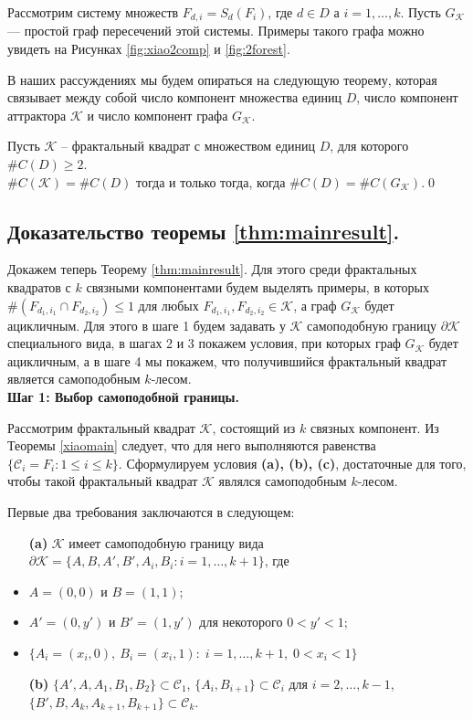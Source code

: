 Рассмотрим систему множеств $F_{d,i}= S_d(F_i)$, где $d\in D$ а $i=1,...,k$.
Пусть $G_{\mathcal{K}}$ --- простой  граф пересечений этой системы.
Примеры такого графа можно увидеть на Рисунках \ref{fig:xiao2comp} и \ref{fig:2forest}.

В наших рассуждениях мы будем опираться на следующую теорему, которая связывает между собой число компонент множества единиц $D$, число компонент аттрактора ${\mathcal{K}}$ и число компонент графа $G_{\mathcal{K}}$.

\begin{theorem}
\label{xiaomain}
Пусть ${\mathcal{K}}$ -- фрактальный квадрат с множеством единиц $D$, для которого   $\#C(D)\geq2$.\\
 $\#C({\mathcal{K}})=\#C(D)$ тогда  и только тогда, когда  $\#C(D)=\#C(G_{\mathcal{K}})$.\qed
\end{theorem}



\subsection{Доказательство теоремы \ref{thm:mainresult}.}\label{ss:mainresultproof}


Докажем теперь Теорему \ref{thm:mainresult}.
Для этого среди фрактальных квадратов с $k$ связными компонентами будем выделять примеры, в которых $\#(F_{d_1,i_1}\cap F_{d_2,i_2})\leq1$ для любых $F_{d_1,i_1}, F_{d_2,i_2}\in\mathcal{K}$, а граф $G_{\mathcal{K}}$ будет ацикличным. 
Для этого в шаге 1 будем задавать у $\mathcal{K}$ самоподобную границу $\partial\mathcal{K}$ специального вида,
в шагах 2 и 3 покажем условия, при которых граф $G_{\mathcal{K}}$ будет ацикличным, а в шаге 4 мы покажем, что получившийся фрактальный квадрат является самоподобным $k$-лесом.\\


\textbf{Шаг 1: Выбор самоподобной границы.}

Рассмотрим фрактальный квадрат ${\mathcal{K}}$, состоящий из $k$ связных компонент.  
Из Теоремы \ref{xiaomain} следует, что для него выполняются равенства  $\{{\mathcal{C}}_i=F_i: 1\leq i\leq k\}$.
Сформулируем условия {\bf(a), (b), (c)}, достаточные для того, чтобы такой фрактальный квадрат ${\mathcal{K}}$ являлся самоподобным $k$-лесом.

Первые два требования заключаются в следующем:
\begin{itemize}
\item[{\bf(a)}] ${\mathcal{K}}$ имеет самоподобную границу вида $ \partial{\mathcal{K}}=\{A, B, A', B', A_i, B_i : i=1,\ldots, k+1\}$, где \item $A=(0,0)$ и $B=(1,1)$;
\item $A'=(0,y')$ и $B'=(1,y')$ для некоторого $0<y'<1$;
\item $\{A_i=(x_i,0),\ B_i=(x_i,1):\; i=1,\ldots,k+1,\; 0<x_i<1\}$
\item[{\bf(b)}] $\{A', A, A_1, B_1, B_2\}\subset\mathcal{C}_1$,\; $\{A_i, B_{i+1}\}\subset\mathcal{C}_i$ для $i=2,\ldots,k-1$,\; $\{B', B, A_k, A_{k+1}, B_{k+1}\}\subset\mathcal{C}_k$.
\end{itemize}

